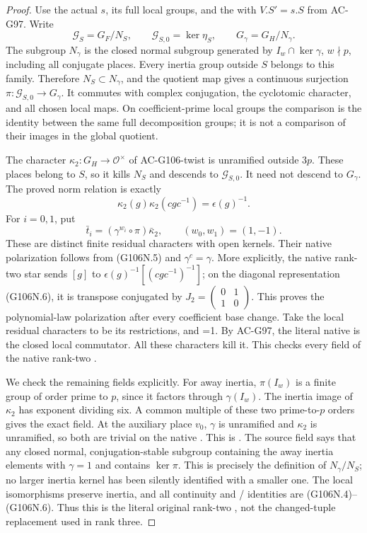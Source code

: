 \begin{proof}
Use the actual  \(s\), its full local
groups, and the  with \(V.S'=s.S\) from
AC-G97. Write
\[
  \mathcal G_S=G_F/N_S,\qquad
  \mathcal G_{S,0}=\ker\eta_S,\qquad G_\gamma=G_H/N_\gamma.
\tag{G106N.4}
\]
The subgroup \(N_\gamma\) is the closed normal subgroup
generated by \(I_w\cap\ker\gamma\), \(w\nmid p\),
including all conjugate places. Every inertia group outside
\(S\) belongs to this family. Therefore \(N_S\subset
N_\gamma\), and the quotient map gives a continuous
surjection \(\pi:\mathcal G_{S,0}\to G_\gamma\).
It commutes with complex conjugation, the cyclotomic
character, and all chosen local maps. On coefficient-prime
local groups the comparison is the identity between the
same full decomposition groups; it is not a comparison of
their images in the global quotient.

The character \(\kappa_2:G_H\to\mathcal O^\times\)
of AC-G106-twist is unramified outside \(3p\).
These places belong to \(S\), so it kills \(N_S\) and
descends to \(\mathcal G_{S,0}\). It need not descend
to \(G_\gamma\). The proved norm relation is exactly
\[
             \kappa_2(g)\kappa_2(cgc^{-1})
                          =\epsilon(g)^{-1}.
\tag{G106N.5}
\]
For \(i=0,1\), put
\[
  \bar t_i=(\gamma^{w_i}\circ\pi)\bar\kappa_2,
  \qquad (w_0,w_1)=(1,-1).
\tag{G106N.6}
\]
These are distinct finite residual characters with open
kernels. Their native polarization follows from
(G106N.5) and \(\gamma^c=\gamma\). More explicitly,
the native rank-two star sends \([g]\) to
\(\epsilon(g)^{-1}[(cgc^{-1})^{-1}]\); on the diagonal
representation (G106N.6), it is transpose conjugated by
\(J_2=\left(\begin{smallmatrix}0&1\\1&0\end{smallmatrix}\right)\).
This proves the polynomial-law polarization after every
coefficient base change. Take the local residual characters
to be its restrictions, and =1.
By AC-G97, the literal native  is the closed
local commutator. All these characters kill it. This
checks every field of the native rank-two .

We check the remaining  fields explicitly.
For away inertia, \(\pi(I_w)\) is a finite group of order
prime to \(p\), since it factors through \(\gamma(I_w)\).
The inertia image of \(\kappa_2\) has exponent dividing
six. A common multiple of these two prime-to-\(p\)
orders gives the exact  field. At the auxiliary
place \(v_0\), \(\gamma\) is unramified and
\(\kappa_2\) is unramified, so both are trivial on
the native . This is .
The source  field says that any closed normal,
conjugation-stable subgroup containing the away inertia
elements with \(\gamma=1\) and  contains
\(\ker\pi\). This is precisely the definition of
\(N_\gamma/N_S\); no larger inertia kernel has been
silently identified with a smaller one.
The local isomorphisms preserve inertia, and all continuity
and / identities are (G106N.4)--(G106N.6).
Thus this is the literal original rank-two ,
not the changed-tuple replacement used in rank three.


\end{proof}
